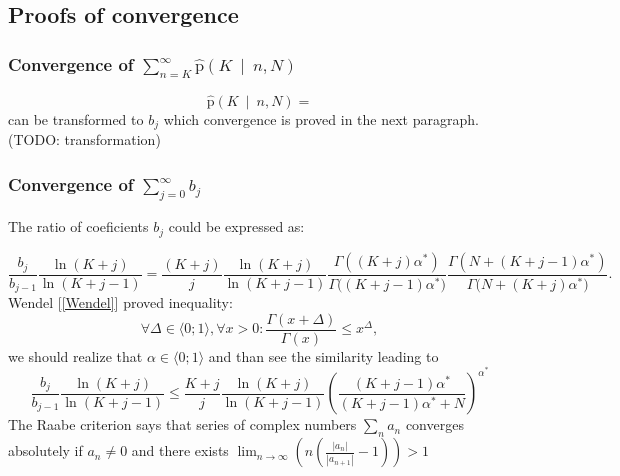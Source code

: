 \subsection {Proofs of convergence}

\subsubsection {Convergence of $\sum_{n=K}^{\infty}{\mathrm{\hat{p}}\left(K \: \middle| \: n,N\right)}$ }
\label{subsubsec:conv1}
\begin{equation}
\mathrm{\hat{p}}\left(K \: \middle| \: n,N\right) = 
\end{equation}
can be transformed to ${b_j}$ which convergence is proved in the next paragraph. (TODO: transformation)

\subsubsection {Convergence of $\sum_{j=0}^{\infty}{b_j}$ }
\label{subsubsec:conv2}

The ratio of coeficients $b_j$ could be expressed as:

\begin{equation}
\frac{b_{j}}{b_{j-1}}\frac{\ln(K+j)}{\ln(K+j-1)}  = \frac{(K+j)}{j}\frac{\ln(K+j)}{\ln(K+j-1)} \frac{\Gamma{((K+j)\alpha^{*})}}{\Gamma{((K+j-1)\alpha^{*}})}\frac{\Gamma{(N+(K+j-1)\alpha^{*})}}{\Gamma({N+(K+j)\alpha^{*})}}.
\end{equation}
Wendel [\ref{Wendel}] proved inequality:
\begin{equation}
\forall \Delta \in \langle0;1\rangle, \forall x > 0: \frac{ \Gamma(x + \Delta)}{\Gamma(x)} \leq x^{\Delta},
\end{equation}
we should realize that $\alpha \in \langle0;1\rangle$ and than see the similarity leading to
\begin{equation}
\frac{b_j}{b_{j-1}} \frac{\ln(K+j)}{\ln(K+j-1)} \leq  \frac{K+j}{j}\frac{\ln(K+j)}{\ln(K+j-1)} {\left( \frac{(K+j-1)\alpha^*}{(K+j-1)\alpha^* + N} \right)}^{\alpha^{*}}
\end{equation}
The Raabe criterion says that series of complex numbers $\sum_{n} a_n$ converges absolutely if $a_n \neq 0$ and there exists $\lim_{n \to \infty} \left( n \left(\frac{|a_n|}{|a_{n+1}|}-1 \right) \right) > 1$

